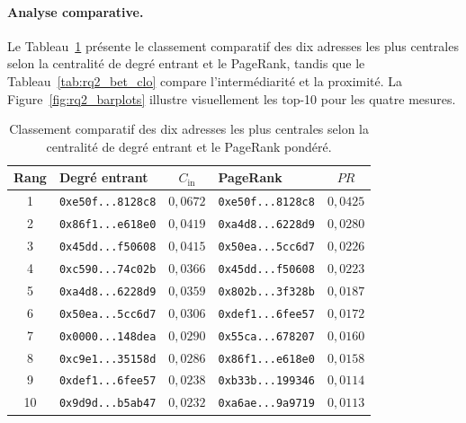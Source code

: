 \paragraph{Analyse comparative.}
Le Tableau~\ref{tab:rq2_deg_pr} pr\'esente le classement comparatif des dix adresses les plus centrales selon la centralit\'e de degr\'e entrant et le PageRank, tandis que le Tableau~\ref{tab:rq2_bet_clo} compare l'interm\'ediarit\'e et la proximit\'e. La Figure~\ref{fig:rq2_barplots} illustre visuellement les top-10 pour les quatre mesures.

\begin{table}[H]
\centering
\caption{Classement comparatif des dix adresses les plus centrales selon la centralit\'e de degr\'e entrant et le PageRank pond\'er\'e.}
\label{tab:rq2_deg_pr}
\begin{tabular}{clclc}
\toprule
Rang & Degr\'e entrant & $C_{\text{in}}$ & PageRank & $PR$ \\
\midrule
1 & \texttt{0xe50f...8128c8} & $0{,}0672$ & \texttt{0xe50f...8128c8} & $0{,}0425$ \\
2 & \texttt{0x86f1...e618e0} & $0{,}0419$ & \texttt{0xa4d8...6228d9} & $0{,}0280$ \\
3 & \texttt{0x45dd...f50608} & $0{,}0415$ & \texttt{0x50ea...5cc6d7} & $0{,}0226$ \\
4 & \texttt{0xc590...74c02b} & $0{,}0366$ & \texttt{0x45dd...f50608} & $0{,}0223$ \\
5 & \texttt{0xa4d8...6228d9} & $0{,}0359$ & \texttt{0x802b...3f328b} & $0{,}0187$ \\
6 & \texttt{0x50ea...5cc6d7} & $0{,}0306$ & \texttt{0xdef1...6fee57} & $0{,}0172$ \\
7 & \texttt{0x0000...148dea} & $0{,}0290$ & \texttt{0x55ca...678207} & $0{,}0160$ \\
8 & \texttt{0xc9e1...35158d} & $0{,}0286$ & \texttt{0x86f1...e618e0} & $0{,}0158$ \\
9 & \texttt{0xdef1...6fee57} & $0{,}0238$ & \texttt{0xb33b...199346} & $0{,}0114$ \\
10 & \texttt{0x9d9d...b5ab47} & $0{,}0232$ & \texttt{0xa6ae...9a9719} & $0{,}0113$ \\
\bottomrule
\end{tabular}
\end{table}

